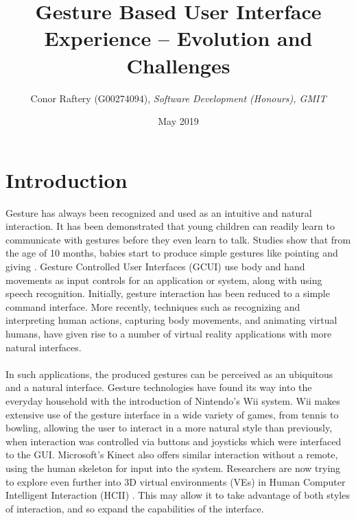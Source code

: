 \documentclass{article}
\title{Gesture Based User Interface Experience – Evolution and Challenges}
\author{Conor Raftery (G00274094), \textit{Software Development (Honours), GMIT}}
\date{May 2019}
\begin{document}

\section{Introduction}
Gesture has always been recognized and used as an intuitive and natural interaction. It has been demonstrated that young children can readily learn to communicate with gestures before they even learn to talk. Studies show that from the age of 10 months, babies start to produce simple gestures like pointing and giving \cite{de2010language}. Gesture Controlled User Interfaces (GCUI) use body and hand movements as input controls for an application or system, along with using speech recognition. Initially, gesture interaction has been reduced to a simple command interface. More recently, techniques such as recognizing and interpreting human actions, capturing body movements, and animating virtual humans, have given rise to a number of virtual reality applications with more natural interfaces.
\\\\
In such applications, the produced gestures can be perceived as an ubiquitous and a natural interface. Gesture technologies have found its way into the everyday household with the introduction of Nintendo’s Wii \cite{schlomer2008gesture} system. Wii makes extensive use of the gesture interface in a wide variety of games, from tennis to bowling, allowing the user to interact in a more natural style than previously, when interaction was controlled via buttons and joysticks which were interfaced to the GUI. Microsoft’s Kinect \cite{zhang2012microsoft} also offers similar interaction without a remote, using the human skeleton for input into the system. Researchers are now trying to explore even further into 3D virtual environments (VEs) in Human Computer Intelligent Interaction (HCII) \cite{moeslund2003arthur}. This may allow it to take advantage of both styles of interaction, and so expand the capabilities of the interface.
\end{document}
